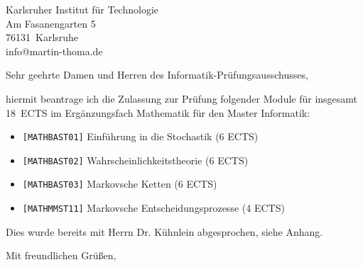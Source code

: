 \documentclass[a4paper, 12pt, KOMAold]{scrlttr2}
\newcommand{\Empfaenger}{Karlsruher Institut für Technologie} %
\newcommand{\EStrasse}{Am Fasanengarten 5}  %
\newcommand{\EPLZ}{76131}                   %
\newcommand{\EOrt}{Karlsruhe}               %
\newcommand{\DocTitle}{Antrag auf Prüfungszulassung} %
\begin{document}
    \begin{letter}{\Empfaenger \\ \EStrasse \\ \EPLZ~\EOrt \\ info@martin-thoma.de}
    \date{\today}%
    \subject{\DocTitle}
    \opening{Sehr geehrte Damen und Herren des Informatik-Prüfungsausschusses,}

    hiermit beantrage ich die Zulassung zur Prüfung folgender Module für
    insgesamt 18~ECTS im Ergänzungsfach Mathematik für den Master Informatik:

    \begin{itemize}
        \item \texttt{[MATHBAST01]} Einführung in die Stochastik (6 ECTS)
        \item \texttt{[MATHBAST02]} Wahrscheinlichkeitstheorie (6 ECTS)
        \item \texttt{[MATHBAST03]} Markovsche Ketten (6 ECTS)
        \item \texttt{[MATHMMST11]} Markovsche Entscheidungsprozesse (4 ECTS)
    \end{itemize}

     Dies wurde bereits mit Herrn Dr. Kühnlein abgesprochen, siehe Anhang.
 
    \closing{Mit freundlichen Grüßen,}
    \end{letter}
\end{document}
